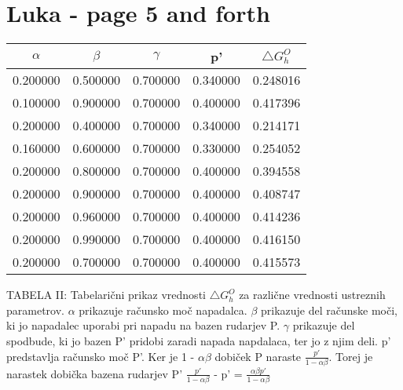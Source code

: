 \documentclass[12pt]{article}
\begin{document}
\section{Luka - page 5 and forth}


\begin{center}
  \begin{tabular}{ | c | c | c | c | c | }
    \hline
    $\alpha$ & $\beta$ & $\gamma$ & p' & $\bigtriangleup G_h^O $  \\ \hline
    0.200000 & 0.500000 & 0.700000 & 0.340000 & 0.248016 \\ \hline
    0.100000 & 0.900000 & 0.700000 & 0.400000 & 0.417396 \\ \hline
    0.200000 & 0.400000 & 0.700000 & 0.340000 & 0.214171 \\ \hline
    0.160000 & 0.600000 & 0.700000 & 0.330000 & 0.254052 \\ \hline
    0.200000 & 0.800000 & 0.700000 & 0.400000 & 0.394558 \\ \hline
    0.200000 & 0.900000 & 0.700000 & 0.400000 & 0.408747 \\ \hline
    0.200000 & 0.960000 & 0.700000 & 0.400000 & 0.414236 \\ \hline
    0.200000 & 0.990000 & 0.700000 & 0.400000 & 0.416150 \\ \hline
    0.200000 & 0.700000 & 0.700000 & 0.400000 & 0.415573 \\ \hline
  \end{tabular}
\end{center}
TABELA II: Tabelarični prikaz vrednosti $\bigtriangleup G_h^O $ za različne vrednosti ustreznih parametrov. $\alpha$ prikazuje računsko moč napadalca. $\beta$ prikazuje del računske moči, ki jo napadalec uporabi pri napadu na bazen rudarjev P. $\gamma$ prikazuje del spodbude, ki jo bazen P' pridobi zaradi napada napdalaca, ter jo z njim deli. p' predstavlja računsko moč P'.
\newline
\newline
Ker je 1 - $\alpha\beta$ dobiček P naraste $\frac{p'}{ 1 - \alpha\beta}$.  Torej je narastek dobička bazena rudarjev P'  $\frac{p'}{1 - \alpha\beta}$ - p' = $\frac{\alpha\beta p'}{1 - \alpha\beta}$
\end{document}
